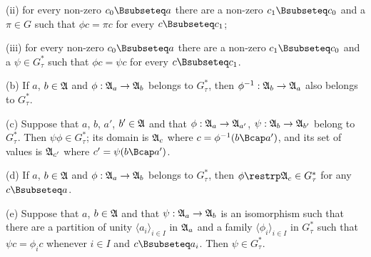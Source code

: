 \quad (ii) for every non-zero
$c_0\Bsubseteq a$ there are a non-zero $c_1\Bsubseteq c_0$ and a
$\pi\in G$ such that $\phi c=\pi c$ for every $c\Bsubseteq c_1$;

\quad (iii) for every non-zero
$c_0\Bsubseteq a$ there are a non-zero $c_1\Bsubseteq c_0$ and a
$\psi\in G^*_{\tau}$ such that $\phi c=\psi c$ for every
$c\Bsubseteq c_1$.

(b) If $a$, $b\in\frak A$ and $\phi:\frak A_a\to\frak A_b$ belongs to
$G^*_{\tau}$, then $\phi^{-1}:\frak A_b\to\frak A_a$ also belongs to
$G^*_{\tau}$.

(c) Suppose that $a$, $b$, $a'$, $b'\in\frak A$ and that $\phi:\frak
A_a\to\frak A_{a'}$, $\psi:\frak A_{b}\to\frak A_{b'}$ belong to
$G^*_{\tau}$.
Then $\psi\phi\in G^*_{\tau}$;
its domain is $\frak A_c$ where $c=\phi^{-1}(b\Bcap a')$, and its
set of values is $\frak A_{c'}$ where $c'=\psi(b\Bcap a')$.

(d) If $a$, $b\in\frak A$ and $\phi:\frak A_a\to\frak A_b$ belongs to
$G^*_{\tau}$, then $\phi\restrp\frak A_c\in G^*_{\tau}$ for any $c\Bsubseteq a$.

(e) Suppose that $a$, $b\in\frak A$ and that
$\psi:\frak A_a\to\frak A_b$ is an isomorphism such that there are a partition of unity $\langle a_i\rangle_{i\in I}$ in $\frak A_a$ and a family $\langle\phi_i\rangle_{i\in I}$ in $G^*_{\tau}$ such that
$\psi c=\phi_ic$ whenever $i\in I$ and $c\Bsubseteq a_i$.   Then
$\psi\in G^*_{\tau}$.


